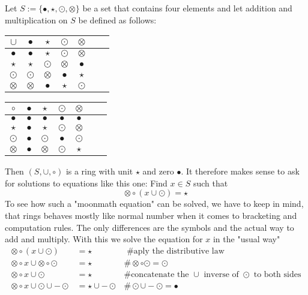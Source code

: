 \begin{example} Let $S:=\{\bullet,\star,\odot,\otimes\}$ be a set that contains four elements and let addition and multiplication on $S$ be defined as follows:
\begin{center}
  \begin{tabular}{c | c c c c c c}
    $\cup$ & $\bullet$ & $\star$ & $\odot$ & $\otimes$ \\\hline
    $\bullet$ & $\bullet$ & $\star$ & $\odot$ & $\otimes$ \\
    $\star$ & $\star$ & $\odot$ & $\otimes$ & $\bullet$ \\
    $\odot$ & $\odot$ & $\otimes$ & $\bullet$ & $\star$ \\
    $\otimes$ & $\otimes$ & $\bullet$ & $\star$ & $\odot$ \\
  \end{tabular} \quad \quad \quad \quad
  \begin{tabular}{c | c c c c c c}
$ \circ $ & $\bullet$ & $\star$ & $\odot$ & $\otimes$ & \\\hline
        $\bullet$ & $\bullet$ & $\bullet$ & $\bullet$ & $\bullet$ &\\
        $\star$ & $\bullet$ & $\star$ & $\odot$ & $\otimes$ &\\
        $\odot$ & $\bullet$ & $\odot$ & $\bullet$ & $\odot$ &\\
        $\otimes$ & $\bullet$ & $\otimes$ & $\odot$ & $\star$ &\\
  \end{tabular}
\end{center}
Then $(S,\cup,\circ)$ is a ring with unit $\star$ and zero $\bullet$. It therefore makes sense to ask for solutions to equations like this one:
Find $x\in S$ such that
$$
\otimes \circ (x \cup \odot ) = \star
$$
To see how such a "moonmath equation" can be solved, we have to keep in mind, that rings behaves mostly like normal number when it comes to bracketing and computation rules. The only differences are the symbols and the actual way to add and multiply. With this we solve the equation for $x$ in the "usual way"
\begin{align*}
\otimes \circ (x \cup \odot ) &= \star & \text{ \# aply the distributive law}\\
\otimes \circ x \cup \otimes \circ \odot  &= \star &\# \otimes \circ \odot = \odot\\
\otimes \circ x \cup \odot  &= \star & \text{\# concatenate the $\cup$ inverse of $\odot$ to both sides}\\
\otimes \circ x \cup \odot \cup -\odot  &= \star \cup -\odot & \# \odot \cup -\odot = \bullet\\

\end{align*}
\end{example}
